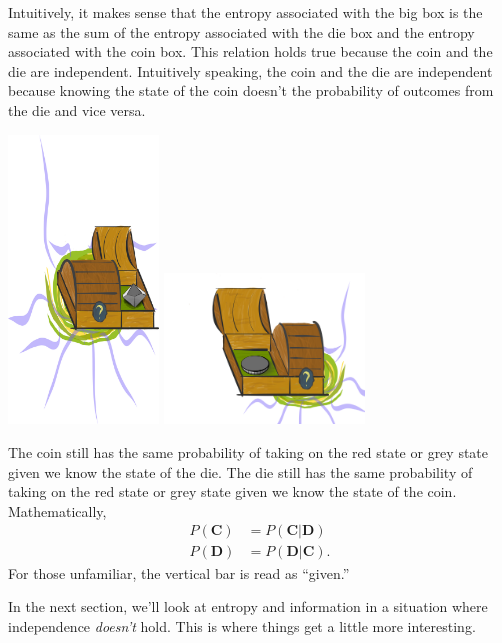 Intuitively, it makes sense that the entropy associated with the big box is the same as the sum of the entropy associated with the die box and the entropy associated with the coin box.
This relation holds true because the coin and the die are independent.
Intuitively speaking, the coin and the die are independent because knowing the state of the coin doesn't the probability of outcomes from the die and vice versa.
\begin{center}
\includegraphics[width=0.3\textwidth]{img/left-box-closed-portal-die}
\includegraphics[trim= 0 -200ex 0 0, clip,width=0.4\textwidth]{img/right-box-closed-portal-coin}
\end{center}
The coin still has the same probability of taking on the red state or grey state given we know the state of the die.
The die still has the same probability of taking on the red state or grey state given we know the state of the coin.
Mathematically,
\begin{align*}
P(\bm{C}) &= P(\bm{C} | \bm{D}) \\
P(\bm{D}) &= P(\bm{D} | \bm{C}) .
\end{align*}
For those unfamiliar, the vertical bar is read as ``given.''

In the next section, we'll look at entropy and information in a situation where independence \textit{doesn't} hold.
This is where things get a little more interesting.
